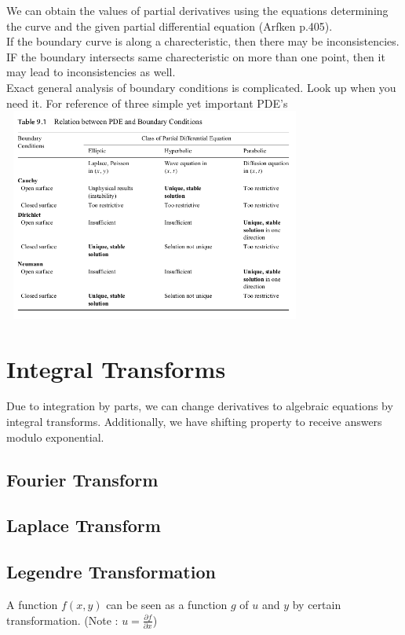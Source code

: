 \documentclass{report}
\begin{document}
\noindent We can obtain the values of partial derivatives using the equations determining the curve and the given partial differential equation (Arfken p.405).\\

\noindent If the boundary curve is along a charecteristic, then there may be inconsistencies. IF the boundary intersects same charecteristic on more than one point, then it may lead to inconsistencies as well.\\

\noindent Exact general analysis of boundary conditions is complicated. Look up when you need it. For reference of three simple yet important PDE's\\

\includegraphics[width=10cm, height=7cm]{./Images/boundary.png}

\section{Integral Transforms}
Due to integration by parts, we can change derivatives to algebraic equations by integral transforms. Additionally, we have shifting property to receive answers modulo exponential.

\subsection{Fourier Transform}

\subsection{Laplace Transform}

\subsection{Legendre Transformation}
A function $f(x,y)$ can be seen as a function $g$ of $u$ and $y$ by certain transformation. (Note : $u=\frac{\partial f}{\partial x}$)
\end{document}
